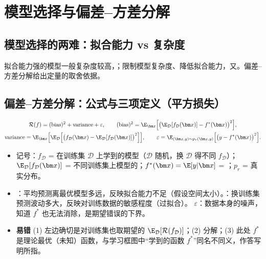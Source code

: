 \section{模型选择与偏差–方差分解}

\subsection{模型选择的两难：拟合能力 vs 复杂度}
拟合能力强的模型一般复杂度较高，；限制模型复杂度、降低拟合能力，又。偏差–方差分解给出定量的取舍依据。

\subsection{偏差–方差分解：公式与三项定义（平方损失）}
\begin{thm}[偏差–方差分解]
\vspace{-3pt}
\begin{gather*}
\mathcal R(f)=(\text{bias})^2+\text{variance}+\varepsilon,\qquad
(\text{bias})^2=\E_{\bm x}\Bigl[\bigl(\E_{\mathcal D}[f_{\mathcal D}(\bm x)]-f^*(\bm x)\bigr)^2\Bigr],\\
\text{variance}=\E_{\bm x}\Bigl[\E_{\mathcal D}\Bigl[\bigl(f_{\mathcal D}(\bm x)-\E_{\mathcal D}[f_{\mathcal D}(\bm x)]\bigr)^2\Bigr]\Bigr],\qquad
\varepsilon=\E_{(\bm x,y)\sim p_r(\bm x,y)}\Bigl[\bigl(y-f^*(\bm x)\bigr)^2\Bigr].
\end{gather*}
\end{thm}
\begin{itemize}
\item 记号：$f_{\mathcal D}$ = 在训练集 $\mathcal D$ 上学到的模型（$\mathcal D$ 随机，换 $\mathcal D$ 得不同 $f_{\mathcal D}$）；$\E_{\mathcal D}[f_{\mathcal D}(\bm x)]$ = 不同训练集上模型的；$f^*(\bm x)=\E[y|\bm x]$ = ；$p_r$ = 真实分布。
\item {}：平均预测离最优模型多远，反映拟合能力不足（假设空间太小）。：换训练集预测波动多大，反映对训练数据的敏感程度（过拟合）。 $\varepsilon$：数据本身的噪声，知道 $f^*$ 也无法消除，是期望错误的下界。
\item \textbf{易错} (1) 左边确切是对训练集也取期望的 $\E_{\mathcal D}[\mathcal R(f_{\mathcal D})]$；(2) 分解；(3) 此处 $f^*$ 是理论最优（未知）函数，与学习框图中“学到的函数 $f^*$”同名不同义，作答写明所指。
\end{itemize}

